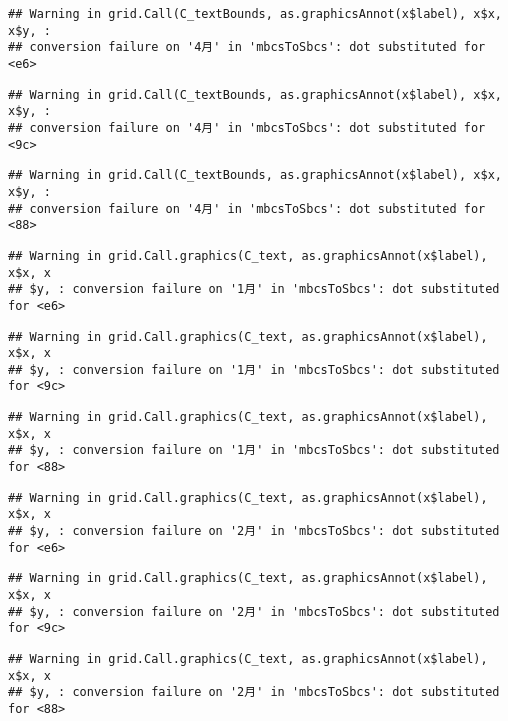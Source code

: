 \documentclass[]{ctexart}
\begin{document}
\begin{verbatim}
## Warning in grid.Call(C_textBounds, as.graphicsAnnot(x$label), x$x, x$y, :
## conversion failure on '4月' in 'mbcsToSbcs': dot substituted for <e6>
\end{verbatim}

\begin{verbatim}
## Warning in grid.Call(C_textBounds, as.graphicsAnnot(x$label), x$x, x$y, :
## conversion failure on '4月' in 'mbcsToSbcs': dot substituted for <9c>
\end{verbatim}

\begin{verbatim}
## Warning in grid.Call(C_textBounds, as.graphicsAnnot(x$label), x$x, x$y, :
## conversion failure on '4月' in 'mbcsToSbcs': dot substituted for <88>
\end{verbatim}

\begin{verbatim}
## Warning in grid.Call.graphics(C_text, as.graphicsAnnot(x$label), x$x, x
## $y, : conversion failure on '1月' in 'mbcsToSbcs': dot substituted for <e6>
\end{verbatim}

\begin{verbatim}
## Warning in grid.Call.graphics(C_text, as.graphicsAnnot(x$label), x$x, x
## $y, : conversion failure on '1月' in 'mbcsToSbcs': dot substituted for <9c>
\end{verbatim}

\begin{verbatim}
## Warning in grid.Call.graphics(C_text, as.graphicsAnnot(x$label), x$x, x
## $y, : conversion failure on '1月' in 'mbcsToSbcs': dot substituted for <88>
\end{verbatim}

\begin{verbatim}
## Warning in grid.Call.graphics(C_text, as.graphicsAnnot(x$label), x$x, x
## $y, : conversion failure on '2月' in 'mbcsToSbcs': dot substituted for <e6>
\end{verbatim}

\begin{verbatim}
## Warning in grid.Call.graphics(C_text, as.graphicsAnnot(x$label), x$x, x
## $y, : conversion failure on '2月' in 'mbcsToSbcs': dot substituted for <9c>
\end{verbatim}

\begin{verbatim}
## Warning in grid.Call.graphics(C_text, as.graphicsAnnot(x$label), x$x, x
## $y, : conversion failure on '2月' in 'mbcsToSbcs': dot substituted for <88>
\end{verbatim}
\end{document}
